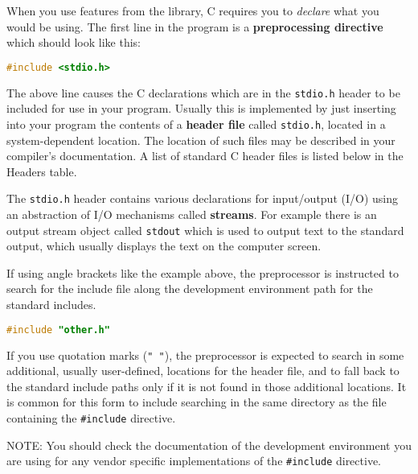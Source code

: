 When you use features from the library, C requires you to \emph{declare} what
you would be using. The first line in the program is a \textbf{preprocessing
directive} which should look like this:
\lstset{basicstyle=\scriptsize, numbers=left, captionpos=b, tabsize=4}
\begin{lstlisting}[caption=Section \thesection listing \arabic{preprocnt},language={C},
breaklines=true,xleftmargin=15pt, label=lst:section\thesection listing\arabic{preprocnt}]
	#include <stdio.h>
\end{lstlisting}

The above line causes the C declarations which are in the \texttt{stdio.h}
header to be included for use in your program. Usually this is implemented by
just inserting into your program the contents of a \textbf{header file} called
\texttt{stdio.h}, located in a system-dependent location. The location of such
files may be described in your compiler's documentation. A list of standard C
header files is listed below in the Headers table.

The \texttt{stdio.h} header contains various declarations for input/output
(I/O) using an abstraction of I/O mechanisms called \textbf{streams}. For
example there is an output stream object called \texttt{stdout} which is used
to output text to the standard output, which usually displays the text on the
computer screen.

If using angle brackets like the example above, the preprocessor is instructed
to search for the include file along the development environment path for the
standard includes.
\lstset{basicstyle=\scriptsize, numbers=left, captionpos=b, tabsize=4}
\begin{lstlisting}[caption=Section \thesection listing \arabic{preprocnt},language={C},
breaklines=true,xleftmargin=15pt, label=lst:section\thesection listing\arabic{preprocnt}]
	#include "other.h"
\end{lstlisting}

If you use quotation marks (\texttt{" "}), the preprocessor is expected to
search in some additional, usually user-defined, locations for the header file,
and to fall back to the standard include paths only if it is not found in those
additional locations. It is common for this form to include searching in the
same directory as the file containing the \texttt{\#include} directive.

NOTE: You should check the documentation of the development environment you
are using for any vendor specific implementations of the \texttt{\#include}
directive. \\

